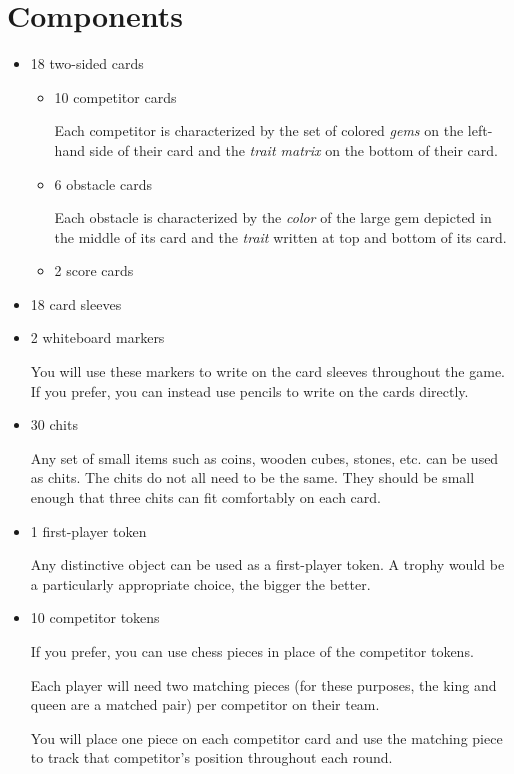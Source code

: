 \documentclass[a6paper, 11pt, parskip=half, DIV=15]{scrartcl}
\begin{document}
\section*{Components}
\begin{itemize}[leftmargin=*]
  \item 18 two-sided cards
  \begin{itemize}[leftmargin=*]
  	\item 10 competitor cards
  	
  	Each competitor is characterized by the set of colored \emph{gems} on the left-hand side of their card and the \emph{trait matrix} on the bottom of their card.
  	\item 6 obstacle cards
  	
  	Each obstacle is characterized by the \emph{color} of the large gem depicted in the middle of its card and the \emph{trait} written at top and bottom of its card.
  	\item 2 score cards
  \end{itemize}
  \item 18 card sleeves
  \item 2 whiteboard markers
  
  You will use these markers to write on the card sleeves throughout the game. If you prefer, you can instead use pencils to write on the cards directly.
  \item 30 chits
  
  Any set of small items such as coins, wooden cubes, stones, etc. can be used as chits. The chits do not all need to be the same. They should be small enough that three chits can fit comfortably on each card.
  
  \item 1 first-player token
  
  Any distinctive object can be used as a first-player token. A trophy would be a particularly appropriate choice, the bigger the better.
  
  \item 10 competitor tokens
  
  If you prefer, you can use chess pieces in place of the competitor tokens.
  
  Each player will need two matching pieces (for these purposes, the king and queen are a matched pair) per competitor on their team. 
  
  You will place one piece on each competitor card and use the matching piece to track that competitor's position throughout each round.
\end{itemize}
\end{document}
